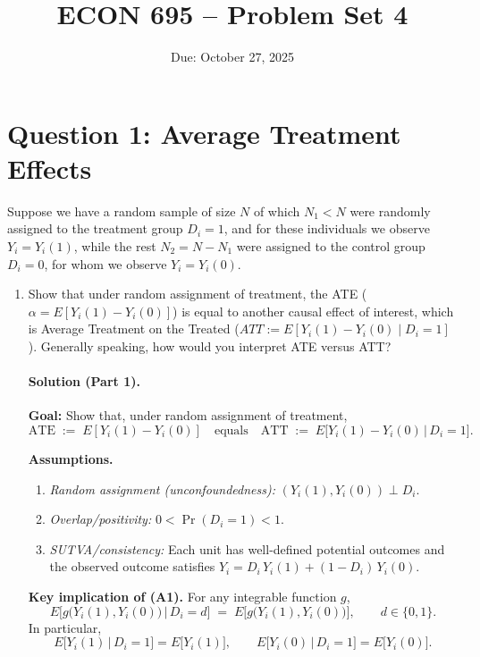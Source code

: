 \documentclass[12pt]{article}
\title{ECON 695 -- Problem Set 4}
\date{Due: October 27, 2025}
\begin{document}
\maketitle

\section*{Question 1: Average Treatment Effects}

Suppose we have a random sample of size $N$ of which $N_1 < N$ were randomly assigned to the treatment group $D_i = 1$, and for these individuals we observe $Y_i = Y_i(1)$, while the rest $N_2 = N - N_1$ were assigned to the control group $D_i = 0$, for whom we observe $Y_i = Y_i(0)$.

\begin{enumerate}[label=\arabic*.]

  \item Show that under random assignment of treatment, the ATE ($\alpha = E[Y_i(1) - Y_i(0)]$) is equal to another causal effect of interest, which is Average Treatment on the Treated ($ATT := E[Y_i(1) - Y_i(0) \mid D_i = 1]$). Generally speaking, how would you interpret ATE versus ATT?

    \paragraph{Solution (Part 1).}
\textbf{Goal:} Show that, under random assignment of treatment,
\[
\text{ATE} \;:=\; E[Y_i(1)-Y_i(0)] \quad \text{equals} \quad 
\text{ATT} \;:=\; E\!\big[Y_i(1)-Y_i(0)\,\big|\,D_i=1\big].
\]

\textbf{Assumptions.}
\begin{enumerate}[label=(A\arabic*)]
  \item \emph{Random assignment (unconfoundedness):} 
  \((Y_i(1),Y_i(0))\perp D_i\).
  \item \emph{Overlap/positivity:} \(0<\Pr(D_i=1)<1\).
  \item \emph{SUTVA/consistency:} Each unit has well-defined potential outcomes and the observed outcome satisfies
  \(Y_i = D_i\,Y_i(1) + (1-D_i)\,Y_i(0)\).
\end{enumerate}

\noindent\textbf{Key implication of (A1).} For any integrable function \(g\),
\[
E\!\big[g\big(Y_i(1),Y_i(0)\big)\,\big|\,D_i=d\big]
\;=\;
E\!\big[g\big(Y_i(1),Y_i(0)\big)\big],
\qquad d\in\{0,1\}.
\]
In particular,
\[
E\!\big[Y_i(1)\,\big|\,D_i=1\big]=E\!\big[Y_i(1)\big],
\qquad
E\!\big[Y_i(0)\,\big|\,D_i=1\big]=E\!\big[Y_i(0)\big].
\]


\end{enumerate}
\end{document}
